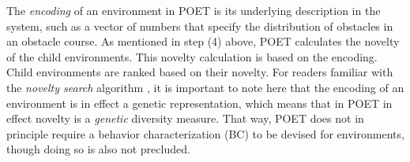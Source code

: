 \documentclass{article}
\newcommand{\jc}[1]{\comments{\textcolor{deepForestGreen}{[JC: #1]}}}
\newcommand{\ks}[1]{\comments{\textcolor{purple}{[Ken: #1]}}}
\newcommand{\rw}[1]{\comments{\textcolor{blue}{[Rui: #1]}}}
\newcommand{\comments}[1]{#1}
\begin{document}
The \emph{encoding} of an environment in POET is its underlying description in the system, such as a vector of numbers that specify the distribution of obstacles in an obstacle course.
As mentioned in step (4) above, POET calculates the novelty of the child environments.  This novelty calculation is based on the encoding. 
Child environments are ranked based on their novelty.
For readers familiar with the \emph{novelty search} algorithm \cite{lehman:ecj11}, it is important to note here that the encoding of an environment is in effect a genetic representation, which means that in POET in effect novelty is a \emph{genetic} diversity measure.  That way, POET does not in principle require a behavior characterization (BC) \cite{lehman:ecj11} to be devised for environments, though doing so is also not precluded.
\end{document}
